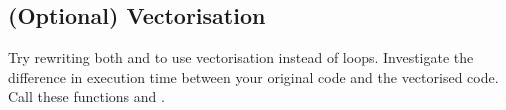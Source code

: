 





\subsection{(Optional) Vectorisation}
Try rewriting both  and  to use vectorisation instead of loops. Investigate the difference in execution time between your original code and the vectorised code. Call these functions  and .



